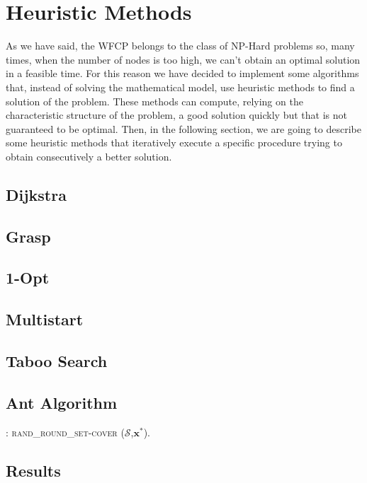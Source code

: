 
\chapter{Heuristic Methods}
\label{chp:5-Heuristic}
As we have said, the WFCP belongs to the class of NP-Hard problems so, many times, when the number of nodes is too high, we can’t obtain an optimal solution in a feasible time.
For this reason we have decided to implement some algorithms that, instead of solving the mathematical model, use heuristic methods to find a solution of the problem. These methods can compute, relying on the characteristic structure of the problem, a good solution quickly but that is not guaranteed to be optimal.
Then, in the following section, we are going to describe some heuristic methods that iteratively execute a specific procedure trying to obtain consecutively a better solution.

\section{Dijkstra}

\section{Grasp}

\section{1-Opt}

\section{Multistart}

\section{Taboo Search}

\section{Ant Algorithm}
\begin{algorithm}[H]
\caption{: \textsc{rand\_round\_set-cover} ($\mathcal{S}$,$\mathbf{x^*}$). \label{alg:SC}}
\begin{algorithmic} 
\REPEAT
{}
\end{algorithmic}
\end{algorithm}
\section{Results}



